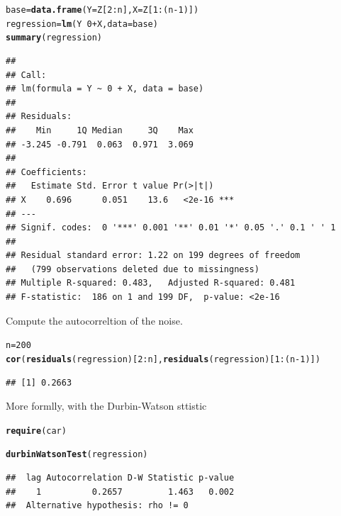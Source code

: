 \documentclass[12pt, a4paper, oneside]{article}\usepackage[]{graphicx}\usepackage[]{color}
\makeatletter
\newcommand{\hlkwd}[1]{\textcolor[rgb]{0.737,0.353,0.396}{\textbf{#1}}}%
\newenvironment{kframe}{%
 \def\at@end@of@kframe{}%
 \ifinner\ifhmode%
  \def\at@end@of@kframe{\end{minipage}}%
  \begin{minipage}{\columnwidth}%
 \fi\fi%
 \def\FrameCommand##1{\hskip\@totalleftmargin \hskip-\fboxsep
 \colorbox{shadecolor}{##1}\hskip-\fboxsep
     \hskip-\linewidth \hskip-\@totalleftmargin \hskip\columnwidth}%
 \MakeFramed {\advance\hsize-\width
   \@totalleftmargin\z@ \linewidth\hsize
   \@setminipage}}%
 {\par\unskip\endMakeFramed%
 \at@end@of@kframe}
\newenvironment{knitrout}{}{} %
\makeatother
\begin{document}
\begin{knitrout}
\color{fgcolor}\begin{kframe}
\begin{alltt}
base = \hlkwd{data.frame}(Y = Z[2:n], X = Z[1:(n - 1)])
regression = \hlkwd{lm}(Y ~ 0 + X, data = base)
\hlkwd{summary}(regression)
\end{alltt}
\begin{verbatim}
## 
## Call:
## lm(formula = Y ~ 0 + X, data = base)
## 
## Residuals:
##    Min     1Q Median     3Q    Max 
## -3.245 -0.791  0.063  0.971  3.069 
## 
## Coefficients:
##   Estimate Std. Error t value Pr(>|t|)    
## X    0.696      0.051    13.6   <2e-16 ***
## ---
## Signif. codes:  0 '***' 0.001 '**' 0.01 '*' 0.05 '.' 0.1 ' ' 1 
## 
## Residual standard error: 1.22 on 199 degrees of freedom
##   (799 observations deleted due to missingness)
## Multiple R-squared: 0.483,	Adjusted R-squared: 0.481 
## F-statistic:  186 on 1 and 199 DF,  p-value: <2e-16
\end{verbatim}
\end{kframe}
\end{knitrout}

Compute the autocorreltion of the noise.  
\begin{knitrout}
\color{fgcolor}\begin{kframe}
\begin{alltt}
n = 200
\hlkwd{cor}(\hlkwd{residuals}(regression)[2:n], \hlkwd{residuals}(regression)[1:(n - 1)])
\end{alltt}
\begin{verbatim}
## [1] 0.2663
\end{verbatim}
\end{kframe}
\end{knitrout}

More formlly, with the Durbin-Watson sttistic
\begin{knitrout}
\color{fgcolor}\begin{kframe}
\begin{alltt}
\hlkwd{require}(car)
\end{alltt}


{\ttfamily\noindent\itshape\color{messagecolor}{\#\# Loading required package: car}}\begin{alltt}
\hlkwd{durbinWatsonTest}(regression)
\end{alltt}
\begin{verbatim}
##  lag Autocorrelation D-W Statistic p-value
##    1          0.2657         1.463   0.002
##  Alternative hypothesis: rho != 0
\end{verbatim}
\end{kframe}
\end{knitrout}
\end{document}
